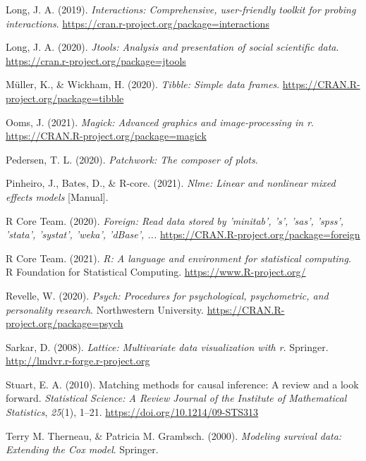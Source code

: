 \documentclass[
  english,
  man, noextraspace,floatsintext]{apa7}
\begin{document}
\begin{appendix}
\leavevmode\hypertarget{ref-R-interactions}{}%
Long, J. A. (2019). \emph{Interactions: Comprehensive, user-friendly
toolkit for probing interactions}.
\url{https://cran.r-project.org/package=interactions}

\leavevmode\hypertarget{ref-R-jtools}{}%
Long, J. A. (2020). \emph{Jtools: Analysis and presentation of social
scientific data}. \url{https://cran.r-project.org/package=jtools}

\leavevmode\hypertarget{ref-R-tibble}{}%
Müller, K., \& Wickham, H. (2020). \emph{Tibble: Simple data frames}.
\url{https://CRAN.R-project.org/package=tibble}

\leavevmode\hypertarget{ref-R-magick}{}%
Ooms, J. (2021). \emph{Magick: Advanced graphics and image-processing in
r}. \url{https://CRAN.R-project.org/package=magick}

\leavevmode\hypertarget{ref-R-patchwork}{}%
Pedersen, T. L. (2020). \emph{Patchwork: The composer of plots}.

\leavevmode\hypertarget{ref-R-nlme}{}%
Pinheiro, J., Bates, D., \& R-core. (2021). \emph{Nlme: Linear and
nonlinear mixed effects models} {[}Manual{]}.

\leavevmode\hypertarget{ref-R-foreign}{}%
R Core Team. (2020). \emph{Foreign: Read data stored by 'minitab', 's',
'sas', 'spss', 'stata', 'systat', 'weka', 'dBase', ...}
\url{https://CRAN.R-project.org/package=foreign}

\leavevmode\hypertarget{ref-R-base}{}%
R Core Team. (2021). \emph{R: A language and environment for statistical
computing}. R Foundation for Statistical Computing.
\url{https://www.R-project.org/}

\leavevmode\hypertarget{ref-R-psych}{}%
Revelle, W. (2020). \emph{Psych: Procedures for psychological,
psychometric, and personality research}. Northwestern University.
\url{https://CRAN.R-project.org/package=psych}

\leavevmode\hypertarget{ref-R-lattice}{}%
Sarkar, D. (2008). \emph{Lattice: Multivariate data visualization with
r}. Springer. \url{http://lmdvr.r-forge.r-project.org}

\leavevmode\hypertarget{ref-stuartMatchingMethodsCausal2010}{}%
Stuart, E. A. (2010). Matching methods for causal inference: A review
and a look forward. \emph{Statistical Science: A Review Journal of the
Institute of Mathematical Statistics}, \emph{25}(1), 1--21.
\url{https://doi.org/10.1214/09-STS313}

\leavevmode\hypertarget{ref-R-survival-book}{}%
Terry M. Therneau, \& Patricia M. Grambsch. (2000). \emph{Modeling
survival data: Extending the Cox model}. Springer.


\end{appendix}
\end{document}
